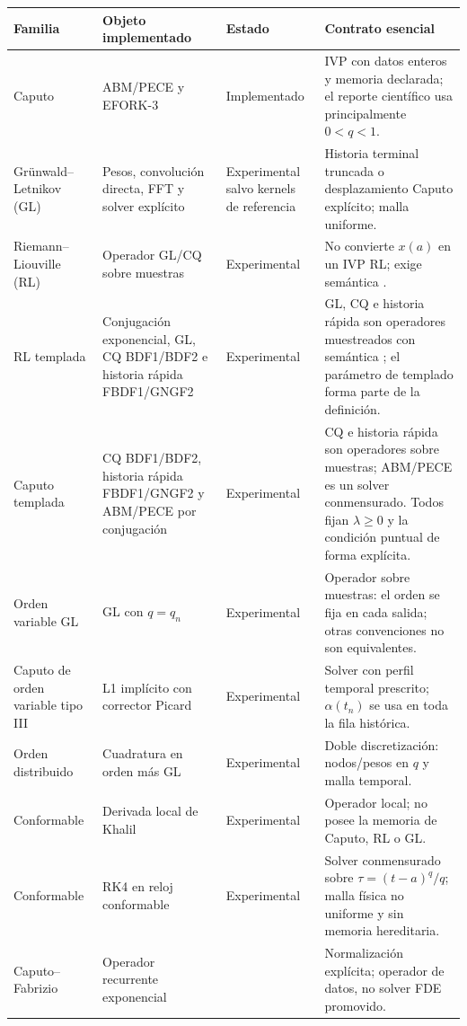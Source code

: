 \begin{center}
\footnotesize
\begin{longtable}{@{}L{0.18\textwidth}L{0.23\textwidth}L{0.19\textwidth}L{0.29\textwidth}@{}}
\toprule
Familia & Objeto implementado & Estado & Contrato esencial \\
\midrule
Caputo & ABM/PECE y EFORK-3 & Implementado & IVP con datos enteros y memoria declarada; el reporte científico usa principalmente \(0<q<1\). \\
Grünwald--Letnikov (GL) & Pesos, convolución directa, FFT y solver explícito & Experimental salvo kernels de referencia & Historia terminal truncada o desplazamiento Caputo explícito; malla uniforme. \\
Riemann--Liouville (RL) & Operador GL/CQ sobre muestras & Experimental & No convierte \(x(a)\) en un IVP RL; exige semántica . \\
RL templada & Conjugación exponencial, GL, CQ BDF1/BDF2 e historia rápida FBDF1/GNGF2 & Experimental & GL, CQ e historia rápida son operadores muestreados con semántica ; el parámetro de templado forma parte de la definición. \\
Caputo templada & CQ BDF1/BDF2, historia rápida FBDF1/GNGF2 y ABM/PECE por conjugación & Experimental & CQ e historia rápida son operadores sobre muestras; ABM/PECE es un solver conmensurado. Todos fijan \(\lambda\ge0\) y la condición puntual de forma explícita. \\
Orden variable GL & GL con \(q=q_n\) & Experimental & Operador sobre muestras: el orden se fija en cada salida; otras convenciones no son equivalentes. \\
Caputo de orden variable tipo III & L1 implícito con corrector Picard & Experimental & Solver con perfil temporal prescrito; \(\alpha(t_n)\) se usa en toda la fila histórica. \\
Orden distribuido & Cuadratura en orden más GL & Experimental & Doble discretización: nodos/pesos en \(q\) y malla temporal. \\
Conformable & Derivada local de Khalil & Experimental & Operador local; no posee la memoria de Caputo, RL o GL. \\
Conformable & RK4 en reloj conformable & Experimental & Solver conmensurado sobre \(\tau=(t-a)^q/q\); malla física no uniforme y sin memoria hereditaria. \\
Caputo--Fabrizio & Operador recurrente exponencial &  & Normalización explícita; operador de datos, no solver FDE promovido. \\

\end{longtable}
\end{center}
